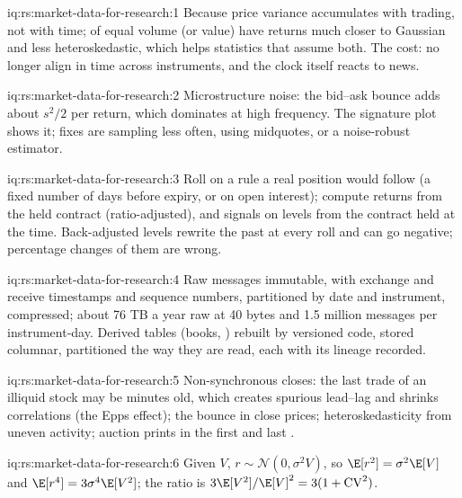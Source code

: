 \begin{solution}{iq:rs:market-data-for-research:1}
Because price variance accumulates with trading, not with time;  of equal volume (or value) have returns much closer to
Gaussian and less heteroskedastic, which helps statistics that assume both. The cost:  no longer align in time across
instruments, and the clock itself reacts to news.
\end{solution}

\begin{solution}{iq:rs:market-data-for-research:2}
Microstructure noise: the bid--ask bounce adds about $s^2/2$ per return, which dominates at high frequency. The signature plot
shows it; fixes are sampling less often, using midquotes, or a noise-robust estimator.
\end{solution}

\begin{solution}{iq:rs:market-data-for-research:3}
Roll on a rule a real position would follow (a fixed number of days before expiry, or on open interest); compute returns from
the held contract (ratio-adjusted), and signals on levels from the contract held at the time. Back-adjusted levels rewrite the
past at every roll and can go negative; percentage changes of them are wrong.
\end{solution}

\begin{solution}{iq:rs:market-data-for-research:4}
Raw messages immutable, with exchange and receive timestamps and sequence numbers, partitioned by date and instrument,
compressed; about 76 TB a year raw at 40 bytes and 1.5 million messages per instrument-day. Derived tables (books, ) rebuilt by
versioned code, stored columnar, partitioned the way they are read, each with its lineage recorded.
\end{solution}

\begin{solution}{iq:rs:market-data-for-research:5}
Non-synchronous closes: the last trade of an illiquid stock may be minutes old, which creates spurious lead--lag and shrinks
correlations (the Epps effect); the bounce in close prices; heteroskedasticity from uneven activity; auction prints in the first
and last .
\end{solution}

\begin{solution}{iq:rs:market-data-for-research:6}
Given $V$, $r \sim \mathcal N(0, \sigma^2V)$, so $\E[r^2] = \sigma^2\E[V]$ and $\E[r^4] = 3\sigma^4\E[V^2]$; the ratio is $3\E[V^2]/\E[V]^2
= 3(1 + \mathrm{CV}^2)$.
\end{solution}
